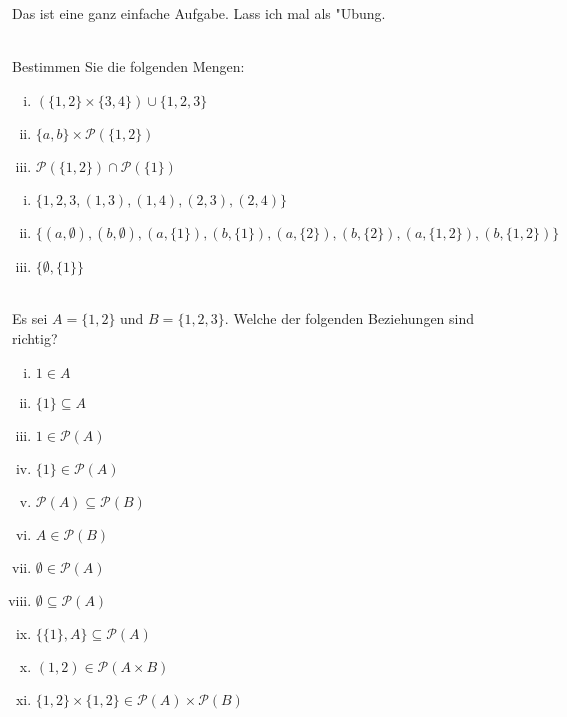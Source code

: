 \begin{loesung}
Das ist eine ganz einfache Aufgabe. Lass ich mal als "Ubung.
\end{loesung}

\\
Bestimmen Sie die folgenden Mengen:
\begin{enumerate}[(i)]
  \item $(\{1,2\}\times\{3,4\})\cup\{1,2,3\}$
  \item $\{a,b\}\times\mathscr{P}(\{1,2\})$
  \item $\mathscr{P}(\{1,2\})\cap\mathscr{P}(\{1\})$
\end{enumerate}

\begin{loesung}
\begin{enumerate}[(i)]
  \item $\{1,2,3,(1,3),(1,4),(2,3),(2,4)\}$
  \item $\{(a,\emptyset),(b,\emptyset),(a,\{1\}),(b,\{1\}),(a,\{2\}),(b,\{2\}),(a,\{1,2\}),(b,\{1,2\})\}$
  \item $\{\emptyset, \{1\}\}$
  
\end{enumerate}
\end{loesung}

\\
Es sei $A=\{1,2\}$ und $B=\{1,2,3\}$. Welche der folgenden Beziehungen sind richtig?
\begin{enumerate}[(i)]
  \item $1\in A$
  \item $\{1\}\subseteq A$
  \item $1\in\mathscr{P}(A)$
  \item $\{1\}\in\mathscr{P}(A)$
  \item $\mathscr{P}(A)\subseteq\mathscr{P}(B)$
  \item $A\in\mathscr{P}(B)$
  \item $\emptyset\in\mathscr{P}(A)$
  \item $\emptyset\subseteq\mathscr{P}(A)$
  \item $\{\{1\},A\}\subseteq\mathscr{P}(A)$
  \item $(1,2)\in\mathscr{P}(A\times B)$
  \item $\{1,2\}\times\{1,2\}\in\mathscr{P}(A)\times\mathscr{P}(B)$
\end{enumerate}

